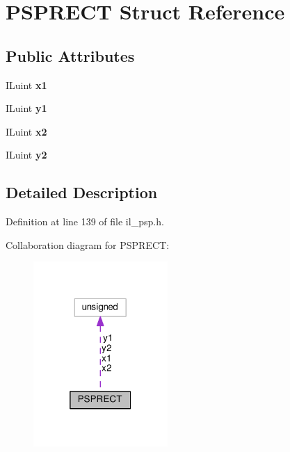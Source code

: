 \hypertarget{structPSPRECT}{}\section{P\+S\+P\+R\+E\+CT Struct Reference}
\label{structPSPRECT}
\subsection*{Public Attributes}
\begin{DoxyCompactItemize}
\item 
\mbox{\label{structPSPRECT_a04968f2d66495ba0e51065b2127d6df6}} 
I\+Luint {\bfseries x1}
\item 
\mbox{\label{structPSPRECT_af86921b1c28de8131cdef63053ff9250}} 
I\+Luint {\bfseries y1}
\item 
\mbox{\label{structPSPRECT_ac373f1f49278d05b31274c7a08956de3}} 
I\+Luint {\bfseries x2}
\item 
\mbox{\label{structPSPRECT_a0739700cc9ada1bfc1966e12b42b4422}} 
I\+Luint {\bfseries y2}
\end{DoxyCompactItemize}


\subsection{Detailed Description}


Definition at line 139 of file il\+\_\+psp.\+h.



Collaboration diagram for P\+S\+P\+R\+E\+CT\+:
\nopagebreak
\begin{figure}[H]
\begin{center}
\leavevmode
\includegraphics[width=145pt]{d0/d96/structPSPRECT__coll__graph}
\end{center}
\end{figure}


